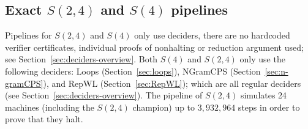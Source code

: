 \documentclass[letterpaper,british,11pt]{article}
\theoremstyle{definition} %
\numberwithin{equation}{section}
\theoremstyle{definition} %
\begin{document}
\subsection{Exact $S(2,4)$ and $S(4)$ pipelines}

Pipelines for $S(2,4)$ and $S(4)$ only use deciders, \ie there are no hardcoded verifier certificates, individual proofs of nonhalting or reduction argument used; see Section~\ref{sec:deciders-overview}. Both $S(4)$ and $S(2,4)$ only use the following deciders: Loops (Section~\ref{sec:loops}), NGramCPS (Section~\ref{sec:n-gramCPS}), and RepWL (Section~\ref{sec:RepWL}); which are all regular deciders (see Section~\ref{sec:deciders-overview}). The pipeline of $S(2,4)$ simulates 24 machines (including the $S(2,4)$ champion) up to $3{,}932{,}964$ steps in order to prove that they halt.
\end{document}
